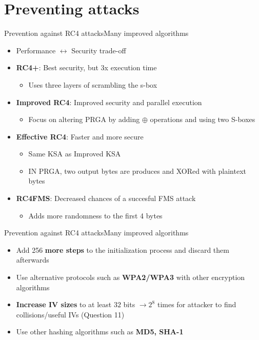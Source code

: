 \documentclass[
	aspectratio=169,	%
	onlytextwidth,		%
	t,					%
	]{beamer}
\begin{document}
\section{Preventing attacks}

\begin{frame}[fragile]{Prevention against RC4 attacks}{Many improved algorithms}
	\begin{itemize}
		\item Performance $\leftrightarrow$ Security trade-off
		\item \textbf{RC4+}: Best security, but 3x execution time
		\begin{itemize}
			\item Uses three layers of scrambling the s-box 
		\end{itemize}
		\item \textbf{Improved RC4}: Improved security and parallel execution
		\begin{itemize}
			\item Focus on altering PRGA by adding $\oplus$ operations and using two S-boxes
		\end{itemize}
		\item \textbf{Effective RC4}: Faster and more secure
		\begin{itemize}
			\item Same KSA as Improved KSA 
			\item IN PRGA, two output bytes are produces and XORed with plaintext bytes
		\end{itemize}
		\item \textbf{RC4FMS}: Decreased chances of a succesful FMS attack
		\begin{itemize}
			\item Adds more randomness to the first 4 bytes 
		\end{itemize}
	\end{itemize}
\end{frame}

\begin{frame}[fragile]{Prevention against RC4 attacks}{Many improved algorithms}
	\begin{itemize}
		\item Add 256 \textbf{more steps} to the initialization process and discard them afterwards
		\item Use alternative protocols such as \textbf{WPA2/WPA3} with other encryption algorithms
		\item \textbf{Increase IV sizes} to at least $32$ bits $\rightarrow 2^{8}$ times for attacker to find collisions/useful IVs (Question 11)
		\item Use other hashing algorithms such as \textbf{MD5, SHA-1}
	\end{itemize}
\end{frame}
\end{document}

